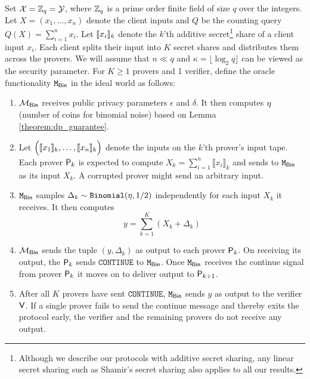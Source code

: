 Set $\mathcal{X} = \mathbb{Z}_q = \mathcal{Y}$, where $\mathbb{Z}_q$ is a prime order finite field of size $q$ over the integers. Let $X=(x_1, \dots, x_n)$ denote the client inputs and  $Q$ be the counting query $Q(X) = \sum_{i=1}^n x_i$.  Let $\llbracket x_i \rrbracket_k$ denote the $k$'th additive secret\footnote{Although we describe our protocols with additive secret sharing, any linear secret sharing such as Shamir's secret sharing also applies to all our results.} share of a client input $x_i$. Each client splits their input into $K$ secret shares and distributes them across the provers. We will assume that $n\ll q$ and $\kappa= \lfloor \log_2 q\rfloor$ can be viewed as the security parameter. For $K \geq 1$ provers and 1 verifier, define the oracle functionality $\mathtt{M}_{\mathsf{Bin}}$ in the ideal world as follows:
%
\begin{enumerate}
	\item{$\mathcal{M}_{\mathsf{Bin}}$ receives public privacy parameters $\epsilon$ and $\delta$. It then computes $\eta$ (number of coins for binomial noise) based on Lemma \ref{theorem:dp_guarantee}.}

	\item{Let $\Big(\llbracket x_1 \rrbracket_k, \dots,\llbracket x_n \rrbracket_k\Big)$ denote the inputs on the $k$'th prover's input tape. Each prover $\mathsf{P}_k$  is expected to compute $X_k = \sum_{i=1}^n \llbracket x_i \rrbracket_k$ and sends to $\mathtt{M}_{\mathsf{Bin}}$ as its input $X_k$. A corrupted prover might send an arbitrary input.} 
	
\item{$\mathtt{M}_{\mathsf{Bin}}$ samples $\Delta_k \sim \texttt{Binomial}(\eta, 1/2)$ independently for each input $X_k$ it receives. It then computes 
%
\begin{equation}
\label{eq:M_bin}
\textstyle
y =  \sum_{k=1}^K (X_k + \Delta_k)
\end{equation}
%
}
\item{$\mathcal{M}_{\mathsf{Bin}}$ sends the tuple $(y, \Delta_k)$ as output to each prover $\mathsf{P}_k$. On receiving its output, the $\mathsf{P}_k$ sends $\texttt{CONTINUE}$ to $\mathtt{M}_{\mathsf{Bin}}$. Once $\mathtt{M}_{\mathsf{Bin}}$ receives the continue signal from prover $\mathsf{P}_k$ it moves on to deliver output to $\mathsf{P}_{k+1}$.}

\item{After all $K$ provers have sent $\texttt{CONTINUE}$, $\mathtt{M}_{\mathsf{Bin}}$ sends $y$ as output to the verifier $\mathsf{V}$. If a single prover fails to send the continue message and thereby exits the protocol early, the verifier and the remaining provers do not receive any output.}

\end{enumerate}

